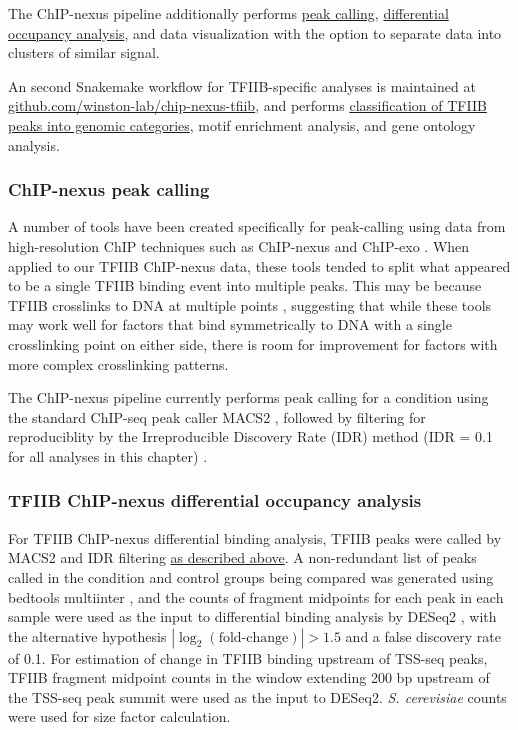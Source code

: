 The ChIP-nexus pipeline additionally performs \hyperref[subsubsec:nexus_peak_calling]{peak calling}, \hyperref[subsubsec:nexus_differential_occupancy]{differential occupancy analysis}, and data visualization with the option to separate data into clusters of similar signal.

An second Snakemake workflow for TFIIB-specific analyses is maintained at\\\href{https://github.com/winston-lab/chip-nexus-tfiib}{github.com/winston-lab/chip-nexus-tfiib}, and performs \hyperref[subsubsec:tfiib_peak_classification]{classification of TFIIB peaks into genomic categories}, motif enrichment analysis, and gene ontology analysis.

\subsubsection{ChIP-nexus peak calling}
\label{subsubsec:nexus_peak_calling}

A number of tools have been created specifically for peak-calling using data from high-resolution ChIP techniques such as ChIP-nexus and ChIP-exo \citep{wang2014, hansen2016}.
When applied to our TFIIB ChIP-nexus data, these tools tended to split what appeared to be a single TFIIB binding event into multiple peaks.
This may be because TFIIB crosslinks to DNA at multiple points \citep{rhee2012}, suggesting that while these tools may work well for factors that bind symmetrically to DNA with a single crosslinking point on either side, there is room for improvement for factors with more complex crosslinking patterns.

The ChIP-nexus pipeline currently performs peak calling for a condition using the standard ChIP-seq peak caller MACS2 \citep{zhang2008}, followed by filtering for reproduciblity by the Irreproducible Discovery Rate (IDR) method (IDR = 0.1 for all analyses in this chapter) \citep{li2011}.

\subsubsection{TFIIB ChIP-nexus differential occupancy analysis}
\label{subsubsec:nexus_differential_occupancy}
For TFIIB ChIP-nexus differential binding analysis, TFIIB peaks were called by MACS2 and IDR filtering \hyperref[subsubsec:tfiib_peak_calling]{as described above}.
A non-redundant list of peaks called in the condition and control groups being compared was generated using bedtools multiinter \citep{quinlan2010}, and the counts of fragment midpoints for each peak in each sample were used as the input to differential binding analysis by DESeq2 \citep{love2014}, with the alternative hypothesis $\allowbreak \left\lvert\log_2 \left(\text{fold-change}\right) \right\rvert > 1.5$ and a false discovery rate of 0.1.
For estimation of change in TFIIB binding upstream of TSS-seq peaks, TFIIB fragment midpoint counts in the window extending 200 bp upstream of the TSS-seq peak summit were used as the input to DESeq2.
\textit{S. cerevisiae} counts were used for size factor calculation.

